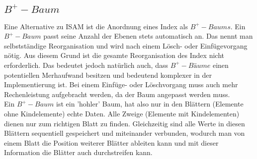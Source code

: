 \documentclass{article}
\begin{document}
	\subsection{$B^+-Baum$}
	Eine Alternative zu ISAM ist die Anordnung eines Index als $B^+-Baums$. Ein $B^+-Baum$ passt seine Anzahl der Ebenen stets automatisch an. Das nennt man selbstständige Reorganisation und wird nach einem Lösch- oder Einfügevorgang nötig. Aus diesem Grund ist die gesamte Reorganisation des Index nicht erforderlich. Das bedeutet jedoch natürlich auch, dass $B^+-Bäume$ einen potentiellen Merhaufwand besitzen und bedeutend komplexer in der Implementierung ist. Bei einem Einfüge- oder Löschvorgang muss auch mehr Rechenleistung aufgebracht werden, da der Baum angepasst werden muss. \\
	Ein $B^+-Baum$ ist ein 'hohler' Baum, hat also nur in den Blättern (Elemente ohne Kindelemente) echte Daten. Alle Zweige (Elemente mit Kindelementen) dienen nur zum richtigen Blatt zu finden. Gleichzeitig sind alle Werte in diesen Blättern sequentiell gespeichert und miteinander verbunden, wodurch man von einem Blatt die Position weiterer Blätter ableiten kann und mit dieser Information die Blätter auch durchstreifen kann. \\
\end{document}
